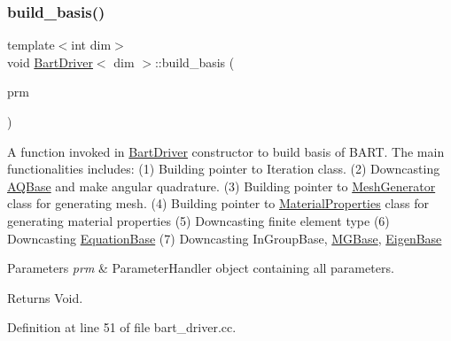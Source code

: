 \mbox{\label{class_bart_driver_ade375a4999de1e775434e11d4e6dd935}} 
\subsubsection{\texorpdfstring{build\+\_\+basis()}{build\_basis()}}
{\footnotesize\ttfamily template$<$int dim$>$ \\
void \hyperlink{class_bart_driver}{Bart\+Driver}$<$ dim $>$\+::build\+\_\+basis (\begin{DoxyParamCaption}\item[{Parameter\+Handler \&}]{prm }\end{DoxyParamCaption})\hspace{0.3cm}{\ttfamily [private]}}

A function invoked in \hyperlink{class_bart_driver}{Bart\+Driver} constructor to build basis of B\+A\+RT. The main functionalities includes\+: (1) Building pointer to Iteration class. (2) Downcasting \hyperlink{class_a_q_base}{A\+Q\+Base} and make angular quadrature. (3) Building pointer to \hyperlink{class_mesh_generator}{Mesh\+Generator} class for generating mesh. (4) Building pointer to \hyperlink{class_material_properties}{Material\+Properties} class for generating material properties (5) Downcasting finite element type (6) Downcasting \hyperlink{class_equation_base}{Equation\+Base} (7) Downcasting In\+Group\+Base, \hyperlink{class_m_g_base}{M\+G\+Base}, \hyperlink{class_eigen_base}{Eigen\+Base}


\begin{DoxyParams}{Parameters}
{\em prm} & Parameter\+Handler object containing all parameters. \\
\hline
\end{DoxyParams}
\begin{DoxyReturn}{Returns}
Void. 
\end{DoxyReturn}


Definition at line 51 of file bart\+\_\+driver.\+cc.

\mbox{\label{class_bart_driver_abc542028ef1ab71693acba10bf017018}} 
